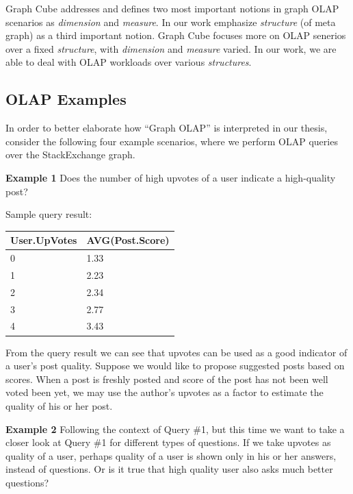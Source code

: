  Graph Cube \cite{DBLP:conf/sigmod/ZhaoLXH11}  addresses and defines two most important notions in graph OLAP scenarios as \textit{dimension} and \textit{measure}. In our work emphasize \textit{structure} (of meta graph) as a third important notion. Graph Cube \cite{DBLP:conf/sigmod/ZhaoLXH11} focuses more on OLAP senerios over a fixed \textit{structure}, with \textit{dimension} and \textit{measure} varied. %
 In our work, we are able to deal with OLAP workloads over various \textit{structures}.


\subsection{OLAP Examples}
 In order to better elaborate how ``Graph OLAP'' is interpreted in our thesis, consider the following four example scenarios, where we perform OLAP queries over the StackExchange graph.

\noindent\textbf{Example 1} Does the number of high upvotes of a user indicate a high-quality post?


Sample query result:
\begin {center}
\begin{tabular}{ l l }
	User.UpVotes&AVG(Post.Score)\\\hline
	0&1.33\\
	1&2.23\\
	2&2.34\\
	3&2.77\\
	4&3.43\\\hline
\end{tabular}
\end {center}

From the query result we can see that upvotes can be used as a good indicator of a user’s post quality. Suppose we would like to propose suggested posts based on scores. When a post is freshly posted and score of the post has not been well voted been yet, we may use the author’s upvotes as a factor to estimate the quality of his or her post.

\noindent\textbf{Example 2} Following the context of Query \#1, but this time we want to take a closer look at Query \#1 for different types of questions. If we take upvotes as quality of a user, perhaps quality of a user is shown only in his or her answers, instead of questions. Or is it true that high quality user also asks much better questions?

